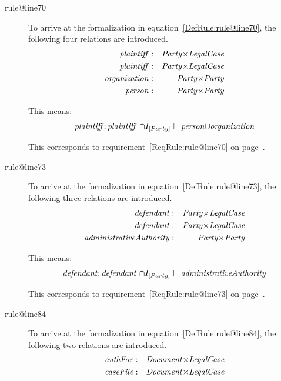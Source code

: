 \documentclass[10pt,a4paper]{report}              %
\theoremstyle{plain}\theorembodyfont{\rmfamily}\newtheorem{definition}{Definition}[section]
\theoremstyle{plain}\theorembodyfont{\rmfamily}\newtheorem{designrule}[definition]{Requirement}
\def\id#1{\mbox{\em #1\/}}
\begin{document}
\begin{description}
\item[rule@line70]
To arrive at the formalization in equation~\ref{DefRule:rule@line70}, the following four relations are introduced.
\begin{eqnarray}
   {\id{plaintiff}}&:&{\id{Party}}{\times}{\id{LegalCase}}\label{DefDecl:plaintiffPartyLegalCase}\\
   {\id{plaintiff}}&:&{\id{Party}}{\times}{\id{LegalCase}}\label{DefDecl:plaintiffPartyLegalCase}\\
   {\id{organization}}&:&{\id{Party}}{\times}{\id{Party}}\label{DefDecl:organizationPartyParty}\\
   {\id{person}}&:&{\id{Party}}{\times}{\id{Party}}\label{DefDecl:personPartyParty}
\end{eqnarray}

This means: 
\begin{equation}
   {\id{plaintiff}};{\id{plaintiff}}~{\cap}I_{[Party]}\ {\vdash}\ {\id{person}}{\cup}{\id{organization}}\label{DefRule:rule@line70}
\end{equation}

This corresponds to requirement~\ref{ReqRule:rule@line70} on page~\pageref{ReqRule:rule@line70}.
\item[rule@line73]
To arrive at the formalization in equation~\ref{DefRule:rule@line73}, the following three relations are introduced.
\begin{eqnarray}
   {\id{defendant}}&:&{\id{Party}}{\times}{\id{LegalCase}}\label{DefDecl:defendantPartyLegalCase}\\
   {\id{defendant}}&:&{\id{Party}}{\times}{\id{LegalCase}}\label{DefDecl:defendantPartyLegalCase}\\
   {\id{administrativeAuthority}}&:&{\id{Party}}{\times}{\id{Party}}\label{DefDecl:administrativeAuthorityPartyParty}
\end{eqnarray}

This means: 
\begin{equation}
   {\id{defendant}};{\id{defendant}}~{\cap}I_{[Party]}\ {\vdash}\ {\id{administrativeAuthority}}\label{DefRule:rule@line73}
\end{equation}

This corresponds to requirement~\ref{ReqRule:rule@line73} on page~\pageref{ReqRule:rule@line73}.
\item[rule@line84]
To arrive at the formalization in equation~\ref{DefRule:rule@line84}, the following two relations are introduced.
\begin{eqnarray}
   {\id{authFor}}&:&{\id{Document}}{\times}{\id{LegalCase}}\label{DefDecl:authForDocumentLegalCase}\\
   {\id{caseFile}}&:&{\id{Document}}{\times}{\id{LegalCase}}\label{DefDecl:caseFileDocumentLegalCase}
\end{eqnarray}


\end{description}
\end{document}
